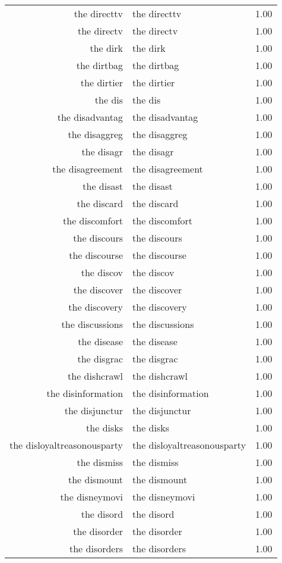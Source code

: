 \begin{table}[ht]
\begin{tabular}{rlr}
  the directtv & the directtv & 1.00 \\ 
  the directv & the directv & 1.00 \\ 
  the dirk & the dirk & 1.00 \\ 
  the dirtbag & the dirtbag & 1.00 \\ 
  the dirtier & the dirtier & 1.00 \\ 
  the dis & the dis & 1.00 \\ 
  the disadvantag & the disadvantag & 1.00 \\ 
  the disaggreg & the disaggreg & 1.00 \\ 
  the disagr & the disagr & 1.00 \\ 
  the disagreement & the disagreement & 1.00 \\ 
  the disast & the disast & 1.00 \\ 
  the discard & the discard & 1.00 \\ 
  the discomfort & the discomfort & 1.00 \\ 
  the discours & the discours & 1.00 \\ 
  the discourse & the discourse & 1.00 \\ 
  the discov & the discov & 1.00 \\ 
  the discover & the discover & 1.00 \\ 
  the discovery & the discovery & 1.00 \\ 
  the discussions & the discussions & 1.00 \\ 
  the disease & the disease & 1.00 \\ 
  the disgrac & the disgrac & 1.00 \\ 
  the dishcrawl & the dishcrawl & 1.00 \\ 
  the disinformation & the disinformation & 1.00 \\ 
  the disjunctur & the disjunctur & 1.00 \\ 
  the disks & the disks & 1.00 \\ 
  the disloyaltreasonousparty & the disloyaltreasonousparty & 1.00 \\ 
  the dismiss & the dismiss & 1.00 \\ 
  the dismount & the dismount & 1.00 \\ 
  the disneymovi & the disneymovi & 1.00 \\ 
  the disord & the disord & 1.00 \\ 
  the disorder & the disorder & 1.00 \\ 
  the disorders & the disorders & 1.00 \\ 

\end{tabular}
\end{table}
